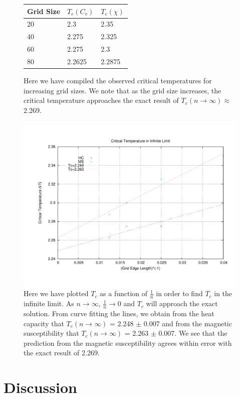 \documentclass[11pt,a4paper]{article}
\begin{document}
\begin{figure}
\centering
\begin{tabular}{| l | l | l |}
\hline
Grid Size & $T_c (C_v)$ & $T_c (\chi)$ \\ \hline
20	&	2.3		& 2.35 \\ \hline
40 	&	2.275	& 2.325 \\ \hline
60 	&	2.275	& 2.3 \\ \hline
80	&	2.2625	& 2.2875	\\ \hline
\end{tabular}
\caption{Here we have compiled the observed critical temperatures for increasing grid sizes. We note that as the grid size increases, the critical temperature approaches the exact result of $T_c (n \rightarrow \infty) \approx$ 2.269.}
\end{figure}
\begin{figure}
\centering
\includegraphics[width=1.0\textwidth]{crittemp.pdf}
\caption{Here we have plotted $T_c$ as a function of $\frac{1}{n}$ in order to find $T_c$ in the infinite limit. As $n \rightarrow \infty$, $\frac{1}{n} \rightarrow 0$ and $T_c$ will approach the exact solution. From curve fitting the lines, we obtain from the heat capacity that $T_c(n\rightarrow \infty)$ = 2.248 $\pm$ 0.007 and from the magnetic susceptibility that $T_c(n\rightarrow \infty)$ = 2.263 $\pm$ 0.007. We see that the prediction from the magnetic susceptibility agrees within error with the exact result of 2.269.}
\end{figure}


\section{Discussion}
\end{document}
